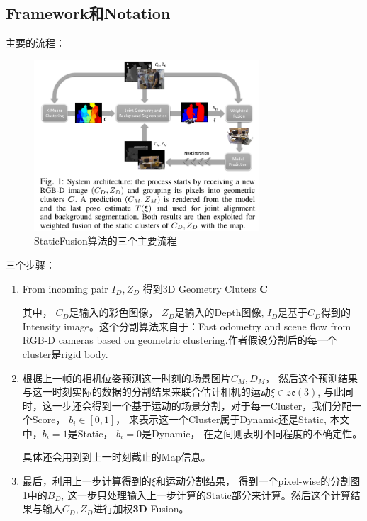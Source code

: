 \subsection{Framework和Notation}

主要的流程：
\begin{figure}[!hbtp]
\centering
\includegraphics[width=0.75\textwidth]{SemanticSLAM/StaticFusion0.png}
\caption{StaticFusion算法的三个主要流程}
\label{StaticFusion0}
\end{figure}

三个步骤：
\begin{enumerate}
\item From incoming pair $I_D, Z_D$ 得到3D Geometry Cluters $\mathbf{C}$

其中， $C_D$是输入的彩色图像， $Z_D$是输入的Depth图像, $I_D$是基于$C_D$得到的Intensity image。这个分割算法来自于：Fast odometry and scene flow from RGB-D cameras based on geometric clustering.作者假设分割后的每一个cluster是rigid body.

\item 根据上一帧的相机位姿预测这一时刻的场景图片$C_M, D_M$， 然后这个预测结果与这一时刻实际的数据的分割结果来联合估计相机的运动$\xi \in \mathfrak{se}(3)$, 与此同时，这一步还会得到一个基于运动的场景分割，对于每一Cluster，我们分配一个Score， $b_i \in [0, 1]$， 来表示这一个Cluster属于Dynamic还是Static, 本文中，$b_i = 1$是Static， $b_i=0$是Dynamic， 在之间则表明不同程度的不确定性。

具体还会用到到上一时刻截止的Map信息。

\item 最后，利用上一步计算得到的$\xi$和运动分割结果， 得到一个pixel-wise的分割图\ref{StaticFusion0}中的$B_D$, 这一步只处理输入上一步计算的Static部分来计算。然后这个计算结果与输入$C_D, Z_D$进行加权\textbf{3D} Fusion。

\end{enumerate}


